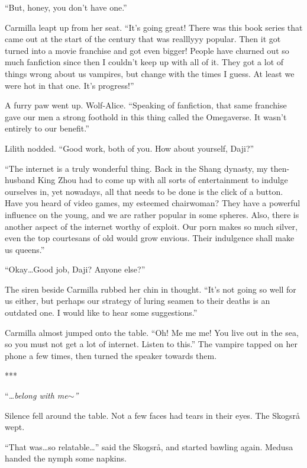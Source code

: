 “But, honey, you don’t have one.”

Carmilla leapt up from her seat. “It’s going great! There was this book series that came out at the start of the century that was realllyyy popular. Then it got turned into a movie franchise and got even bigger! People have churned out so much fanfiction since then I couldn’t keep up with all of it. They got a lot of things wrong about us vampires, but change with the times I guess. At least we were hot in that one. It’s progress!”

A furry paw went up. Wolf-Alice. “Speaking of fanfiction, that same franchise gave our men a strong foothold in this thing called the Omegaverse. It wasn’t entirely to our benefit.”

Lilith nodded. “Good work, both of you. How about yourself, Daji?”

“The internet is a truly wonderful thing. Back in the Shang dynasty, my then-husband King Zhou had to come up with all sorts of entertainment to indulge ourselves in, yet nowadays, all that needs to be done is the click of a button. Have you heard of video games, my esteemed chairwoman? They have a powerful influence on the young, and we are rather popular in some spheres. Also, there is another aspect of the internet worthy of exploit. Our porn makes so much silver, even the top courtesans of old would grow envious. Their indulgence shall make us queens.”

“Okay…Good job, Daji? Anyone else?”

The siren beside Carmilla rubbed her chin in thought. “It’s not going so well for us either, but perhaps our strategy of luring seamen to their deaths is an outdated one. I would like to hear some suggestions.”

Carmilla almost jumped onto the table. “Oh! Me me me! You live out in the sea, so you must not get a lot of internet. Listen to this.” The vampire tapped on her phone a few times, then turned the speaker towards them.

\begin{center}
    ***
\end{center}

\noindent ``\textit{…belong with me$\sim$''} 

Silence fell around the table. Not a few faces had tears in their eyes. The Skogsrå wept. 

“That was…so relatable…” said the Skogsrå, and started bawling again. Medusa handed the nymph some napkins. 

